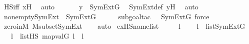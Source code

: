 \begin{isabellebody}
\ HS{\isacharunderscore}{\kern0pt}iff\ x{\isacharprime}{\kern0pt}H\ \isamarkupfalse%
\ auto\ \isanewline
\ \ \isamarkupfalse%
\ \isamarkupfalse%
\ {\isachardoublequoteopen}y\ {\isasymin}\ SymExt{\isacharparenleft}{\kern0pt}G{\isacharparenright}{\kern0pt}{\isachardoublequoteclose}\ \isamarkupfalse%
\ SymExt{\isacharunderscore}{\kern0pt}def\ y{\isacharprime}{\kern0pt}H\ \isamarkupfalse%
\ auto\isanewline
{}\isamarkupfalse%
%
\endisatagproof
{\isafoldproof}%
%
\isadelimproof
\isanewline
%
\endisadelimproof
\isanewline
{}\isamarkupfalse%
\ nonempty{\isacharunderscore}{\kern0pt}SymExt\ {\isacharcolon}{\kern0pt}\ {\isachardoublequoteopen}SymExt{\isacharparenleft}{\kern0pt}G{\isacharparenright}{\kern0pt}\ {\isasymnoteq}\ {}{\isachardoublequoteclose}\ \isanewline
%
\isadelimproof
\ \ %
\endisadelimproof
%
\isatagproof
{}\isamarkupfalse%
{\isacharparenleft}{\kern0pt}subgoal{\isacharunderscore}{\kern0pt}tac\ {\isachardoublequoteopen}{}\ {\isasymin}\ SymExt{\isacharparenleft}{\kern0pt}G{\isacharparenright}{\kern0pt}{\isachardoublequoteclose}{\isacharcomma}{\kern0pt}\ force{\isacharparenright}{\kern0pt}\isanewline
\ \ \isamarkupfalse%
\ zero{\isacharunderscore}{\kern0pt}in{\isacharunderscore}{\kern0pt}M\ M{\isacharunderscore}{\kern0pt}subset{\isacharunderscore}{\kern0pt}SymExt\isanewline
\ \ \isamarkupfalse%
\ auto%
\endisatagproof
{\isafoldproof}%
%
\isadelimproof
\isanewline
%
\endisadelimproof
\isanewline
\isanewline
{}\isamarkupfalse%
\ ex{\isacharunderscore}{\kern0pt}HS{\isacharunderscore}{\kern0pt}name{\isacharunderscore}{\kern0pt}list\ {\isacharcolon}{\kern0pt}\ \isanewline
\ \ \ l\ \isanewline
\ \ \ {\isachardoublequoteopen}l\ {\isasymin}\ list{\isacharparenleft}{\kern0pt}SymExt{\isacharparenleft}{\kern0pt}G{\isacharparenright}{\kern0pt}{\isacharparenright}{\kern0pt}{\isachardoublequoteclose}\ \isanewline
\ \ \ {\isachardoublequoteopen}{\isasymexists}l{\isacharprime}{\kern0pt}\ {\isasymin}\ list{\isacharparenleft}{\kern0pt}HS{\isacharparenright}{\kern0pt}{\isachardot}{\kern0pt}\ map{\isacharparenleft}{\kern0pt}val{\isacharparenleft}{\kern0pt}G{\isacharparenright}{\kern0pt}{\isacharcomma}{\kern0pt}\ l{\isacharprime}{\kern0pt}{\isacharparenright}{\kern0pt}\ {\isacharequal}{\kern0pt}\ l{\isachardoublequoteclose}\ \isanewline
%
\isadelimproof
\isanewline
\ \ %
\endisadelimproof
%
\isatagproof
{}\isamarkupfalse%

\end{isabellebody}
